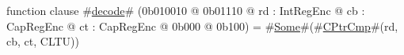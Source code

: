 function clause #\hyperref[sailMIPSzdecode]{decode}# (0b010010 @ 0b01110 @ rd : IntRegEnc @ cb : CapRegEnc @ ct : CapRegEnc @ 0b000 @ 0b100) = #\hyperref[sailMIPSzSome]{Some}#(#\hyperref[sailMIPSzCPtrCmp]{CPtrCmp}#(rd, cb, ct, CLTU))
